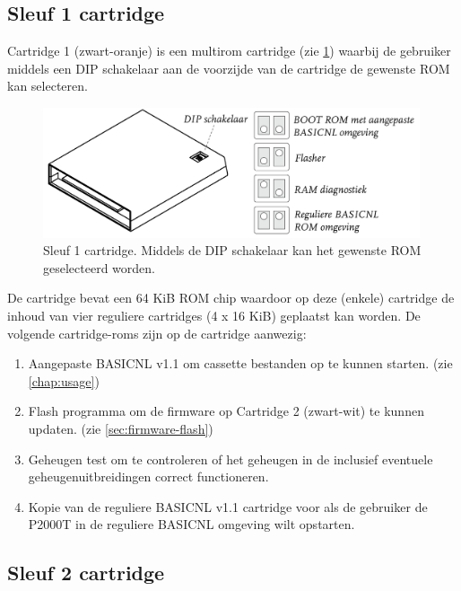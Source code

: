 %
%
%
\subsection{Sleuf 1 cartridge}


Cartridge 1 (zwart-oranje) is een  multirom cartridge (zie \cref{fig:cartridge-sleuf1}) waarbij de gebruiker middels een DIP schakelaar aan de voorzijde van de cartridge de gewenste ROM kan selecteren.

\begin{figure}[h!]
    \centering
    \includegraphics[width=0.99\textwidth]{img/slot1-cartridge.png}
    \caption{Sleuf 1 cartridge. Middels de DIP schakelaar kan het gewenste ROM geselecteerd worden.}
    \label{fig:cartridge-sleuf1}
\end{figure}

De cartridge bevat een 64 KiB ROM chip waardoor op deze (enkele) cartridge de inhoud van vier reguliere cartridges (4 x 16 KiB) geplaatst kan worden. De volgende cartridge-roms zijn op de  cartridge aanwezig:

\begin{enumerate}[noitemsep]
    \item Aangepaste BASICNL v1.1 om cassette bestanden op te kunnen starten. (zie \cref{chap:usage})
    \item Flash programma om de firmware op Cartridge 2 (zwart-wit) te kunnen updaten. (zie \cref{sec:firmware-flash})
    \item Geheugen test om te controleren of het geheugen in de  inclusief eventuele geheugenuitbreidingen correct functioneren.
    \item Kopie van de reguliere BASICNL v1.1 cartridge voor als de gebruiker de P2000T in de reguliere BASICNL omgeving wilt opstarten.
\end{enumerate}

%
%
%
\subsection{Sleuf 2 cartridge}

